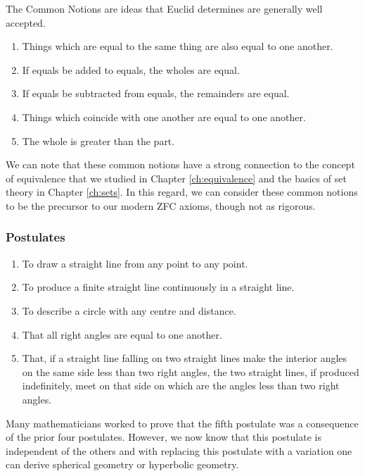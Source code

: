 \documentclass[
]{book}
\providecommand{\tightlist}{%
  \setlength{\itemsep}{0pt}\setlength{\parskip}{0pt}}
\theoremstyle{definition}
\theoremstyle{definition}
\theoremstyle{definition}
\theoremstyle{definition}
\theoremstyle{remark}
\begin{document}
The Common Notions are ideas that Euclid determines are generally well accepted.

\begin{enumerate}
\def\labelenumi{\arabic{enumi}.}
\tightlist
\item
  Things which are equal to the same thing are also equal to one another.
\item
  If equals be added to equals, the wholes are equal.
\item
  If equals be subtracted from equals, the remainders are equal.
\item
  Things which coincide with one another are equal to one another.
\item
  The whole is greater than the part.
\end{enumerate}

We can note that these common notions have a strong connection to the concept of equivalence that we studied in Chapter \ref{ch:equivalence} and the basics of set theory in Chapter \ref{ch:sets}. In this regard, we can consider these common notions to be the precursor to our modern ZFC axioms, though not as rigorous.

\hypertarget{postulates}{%
\subsubsection*{Postulates}\label{postulates}}

\begin{enumerate}
\def\labelenumi{\arabic{enumi}.}
\tightlist
\item
  To draw a straight line from any point to any point.
\item
  To produce a finite straight line continuously in a straight line.
\item
  To describe a circle with any centre and distance.
\item
  That all right angles are equal to one another.
\item
  That, if a straight line falling on two straight lines make the interior angles on the same side less than two right angles, the two straight lines, if produced indefinitely, meet on that side on which are the angles less than two right angles.
\end{enumerate}

Many mathematicians worked to prove that the fifth postulate was a consequence of the prior four postulates. However, we now know that this postulate is independent of the others and with replacing this postulate with a variation one can derive spherical geometry or hyperbolic geometry.
\end{document}
